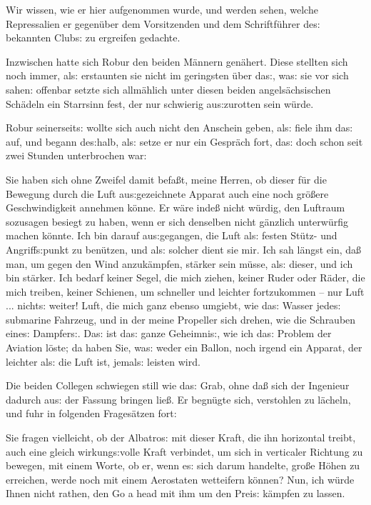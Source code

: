 \documentclass[oneside,12pt]{book}
\newenvironment{antiqua}{\normalfont}{}
\newcommand{\s}{s:}
\begin{document}
Wir wissen, wie er hier aufgenommen wurde, und werden sehen, welche
Repressalien er gegen\"uber dem Vorsitzenden und dem Schriftf\"uhrer
de{\s} bekannten Club{\s} zu ergreifen gedachte.

Inzwischen hatte sich Robur den beiden M\"annern gen\"ahert. Diese
stellten sich noch immer, al{\s} erstaunten sie nicht im geringsten
\"uber da{\s}, wa{\s} sie vor sich sahen: offenbar setzte sich
allm\"ahlich unter diesen beiden angels\"achsischen Sch\"adeln ein
Starrsinn fest, der nur schwierig au{\s}zurotten sein w\"urde.

Robur seinerseit{\s} wollte sich auch nicht den Anschein geben,
al{\s} fiele ihm da{\s} auf, und begann de{\s}halb, al{\s} setze er
nur ein Gespr\"ach fort, da{\s} doch schon seit zwei Stunden
unterbrochen war:

{\glqq}Sie haben sich ohne Zweifel damit befa{\ss}t, meine Herren, ob
dieser f\"ur die Bewegung durch die Luft au{\s}gezeichnete Apparat
auch eine noch gr\"o{\ss}ere Geschwindigkeit annehmen k\"onne. Er
w\"are inde{\ss} nicht w\"urdig, den Luftraum sozusagen besiegt zu
haben, wenn er sich denselben nicht g\"anzlich unterw\"urfig machen
k\"onnte. Ich bin darauf au{\s}gegangen, die Luft al{\s} festen
St\"utz- und Angriff{\s}punkt zu ben\"utzen, und al{\s} solcher dient
sie mir. Ich sah l\"angst ein, da{\ss} man, um gegen den Wind
anzuk\"ampfen, st\"arker sein m\"usse, al{\s} dieser, und ich bin
st\"arker. Ich bedarf keiner Segel, die mich ziehen, keiner Ruder
oder R\"ader, die mich treiben, keiner Schienen, um schneller und
leichter fort\/zukommen -- nur Luft ... nicht{\s} weiter! Luft, die
mich ganz ebenso umgiebt, wie da{\s} Wasser jede{\s} submarine
Fahrzeug, und in der meine Propeller sich drehen, wie die Schrauben
eine{\s} Dampfer{\s}. Da{\s} ist da{\s} ganze Geheimni{\s}, wie ich
da{\s} Problem der Aviation l\"oste; da haben Sie, wa{\s} weder ein
Ballon, noch irgend ein Apparat, der leichter al{\s} die Luft ist,
jemal{\s} leisten wird.{\grqq}

Die beiden Collegen schwiegen still wie da{\s} Grab, ohne da{\ss}
sich der Ingenieur dadurch au{\s} der Fassung bringen lie{\ss}. Er
begn\"ugte sich, verstohlen zu l\"acheln, und fuhr in folgenden
Frages\"atzen fort:

{\glqq}Sie fragen vielleicht, ob der {\glqq}Albatro{\s}{\grqq} mit
dieser Kraft, die ihn horizontal treibt, auch eine gleich
wirkung{\s}volle Kraft verbindet, um sich in verticaler Richtung zu
bewegen, mit einem Worte, ob er, wenn e{\s} sich darum handelte,
gro{\ss}e H\"ohen zu erreichen, werde noch mit einem Aerostaten
wetteifern k\"onnen? Nun, ich w\"urde Ihnen nicht rathen, den
\begin{antiqua}Go a head\end{antiqua} mit ihm um den Prei{\s}
k\"ampfen zu lassen.{\grqq}
\end{document}
